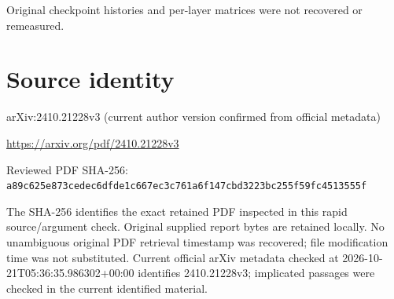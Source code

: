 \documentclass[11pt]{article}
\begin{document}
Original checkpoint histories and per-layer matrices were not recovered or remeasured.\par

\section*{Source identity}

arXiv:2410.21228v3 (current author version confirmed from official metadata)

\url{https://arxiv.org/pdf/2410.21228v3}

Reviewed PDF SHA-256: \nolinkurl{a89c625e873cedec6dfde1c667ec3c761a6f147cbd3223bc255f59fc4513555f}

The SHA-256 identifies the exact retained PDF inspected in this rapid source/argument check. Original supplied report bytes are retained locally. No unambiguous original PDF retrieval timestamp was recovered; file modification time was not substituted. Current official arXiv metadata checked at 2026-10-21T05:36:35.986302+00:00 identifies 2410.21228v3; implicated passages were checked in the current identified material.
\end{document}
